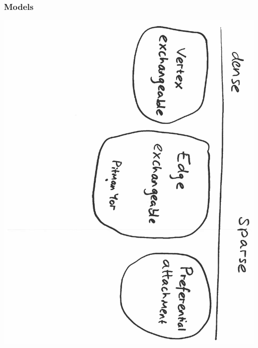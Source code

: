 \documentclass[final,hyperref={pdfpagelabels=false},noamsthm]{beamer}
\begin{document}
\begin{frame}
	\frametitle{Models}
	\includegraphics[angle=90,origin=c,scale=0.4]{fig/models4}
\end{frame}
\end{document}
